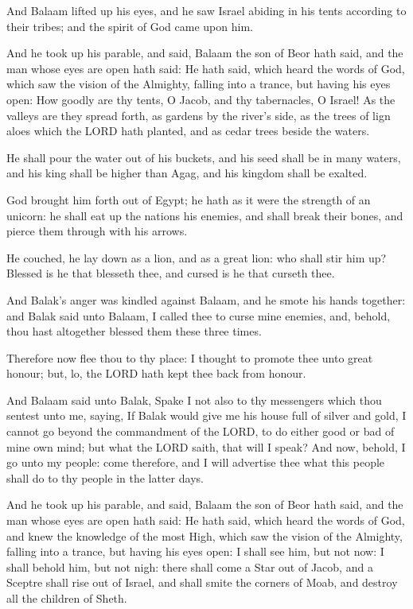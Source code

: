 \verse And Balaam lifted up his eyes, and he saw Israel abiding in his
tents according to their tribes; and the spirit of God came upon him.

\verse And he took up his parable, and said, Balaam the son of Beor hath
said, and the man whose eyes are open hath said: \verse He hath said,
which heard the words of God, which saw the vision of the Almighty,
falling into a trance, but having his eyes open: \verse How goodly are
thy tents, O Jacob, and thy tabernacles, O Israel!  \verse As the
valleys are they spread forth, as gardens by the river's side, as the
trees of lign aloes which the LORD hath planted, and as cedar trees
beside the waters.

\verse He shall pour the water out of his buckets, and his seed shall be
in many waters, and his king shall be higher than Agag, and his
kingdom shall be exalted.

\verse God brought him forth out of Egypt; he hath as it were the
strength of an unicorn: he shall eat up the nations his enemies, and
shall break their bones, and pierce them through with his arrows.

\verse He couched, he lay down as a lion, and as a great lion: who shall
stir him up? Blessed is he that blesseth thee, and cursed is he that
curseth thee.

\verse And Balak's anger was kindled against Balaam, and he smote his
hands together: and Balak said unto Balaam, I called thee to curse
mine enemies, and, behold, thou hast altogether blessed them these
three times.

\verse Therefore now flee thou to thy place: I thought to promote thee
unto great honour; but, lo, the LORD hath kept thee back from honour.

\verse And Balaam said unto Balak, Spake I not also to thy messengers
which thou sentest unto me, saying, \verse If Balak would give me his
house full of silver and gold, I cannot go beyond the commandment of
the LORD, to do either good or bad of mine own mind; but what the LORD
saith, that will I speak?  \verse And now, behold, I go unto my people:
come therefore, and I will advertise thee what this people shall do to
thy people in the latter days.

\verse And he took up his parable, and said, Balaam the son of Beor
hath said, and the man whose eyes are open hath said: \verse He hath
said, which heard the words of God, and knew the knowledge of the most
High, which saw the vision of the Almighty, falling into a trance, but
having his eyes open: \verse I shall see him, but not now: I shall
behold him, but not nigh: there shall come a Star out of Jacob, and a
Sceptre shall rise out of Israel, and shall smite the corners of Moab,
and destroy all the children of Sheth.

